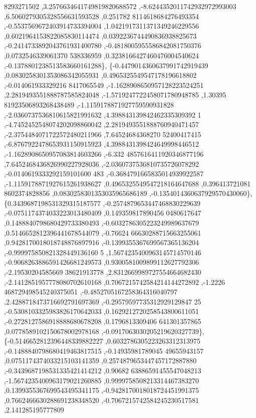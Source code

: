 \begin{DoxyCode}
      8293271502 ,3.2576634641749819820688572 ,-8.6244352011742932972993003 ,6.5060279305328556631593528 ,0.251782
      8114618684276493354 ,-0.5537569672403914733394004 ,1.0421917311371349246229556 ,0.6021964153822085830114474 
      ,0.0392236744490836938825673 ,-0.2414733892043761931400780 ,-0.4818005955586842081750376 ,0.0732546339061370
      538336959 ,0.3238166427460476004540624 ,-0.1378801238513583660161288\},
\{-0.4479014360637991742919439 ,0.0830258301353086342055931 ,0.4965325549547178196618802 ,-0.014061933329216
      8417065549 ,-1.1628908650957128223524251 ,2.2819493551888787585824048 ,-1.5719247722458071780948785 ,1.30395
      81923506893268438489 ,-1.1159178871927759590931828 ,-2.0360737536810615821991632 ,4.398843139842462335309392
      1 ,-4.7452452548074202098860042 ,2.2819493551888760940471457 ,-2.3754484071722572480211966 ,7.64524684368270
      52400417415 ,-6.8767922478653931150915923 ,4.3988431398424649998446512 ,-1.1628908650957083814603266 ,-6.332
      4857616411920346877196 ,7.6452468436826990227928036 ,-2.0360737536810735726078292 ,-0.0140619333292159101600
      483 ,-0.3684791665835014939922587 ,-1.1159178871927615261938627 ,0.4965325549547218164647688 ,0.396413721081
      8602374828856 ,0.0830258301353035965686189 ,-0.1354014360637929570430060\},
\{0.3439687198531329315187577 ,-0.2574879653447468830229639 ,-0.0751174374033223013480409 ,0.149359817890456
      0480617647 ,0.1488840798680429733380493 ,-0.6032786305223249989637679 ,0.5146652812396441678544079 ,-0.76624
      66630288715663255061 ,0.9428170018018748876897916 ,-0.1399355367699567365136204 ,-0.999975850821328449136160
      5 ,1.5674235400963145714570146 ,-0.9068263886591426681249573 ,0.9300581009899112627792306 ,-2.19530204585669
      38621913778 ,2.8312669989727554664682430 ,-2.1412851957778080702610168 ,0.7067215742584214144272892 ,-1.2226
      468729498545240375051 ,-0.4852705167258364316040797 ,2.4288718473716692791697369 ,-0.29579597735312929129847
      25 ,-0.5308103325983826170642033 ,0.1629212720258543800611051 ,-0.2728127586918888680678208 ,0.1796813309406
      641301357865 ,0.0778589102150678002978168 ,-0.0917063030205219620327739\},
\{-0.5146652812396448339882227 ,0.6032786305223263312313975 ,-0.1488840798680419463817515 ,-0.14935981789045
      49655943157 ,0.0751174374033215103141359 ,0.2574879653447457172887880 ,-0.3439687198531335421414212 ,0.90682
      63886591455547048213 ,-1.5674235400963179021260885 ,0.9999758508213314467383270 ,0.1399355367699543495341175
       ,-0.9428170018018724451991375 ,0.7662466630288691238348520 ,-0.7067215742584245230517581 ,2.141285195777809

\end{DoxyCode}
